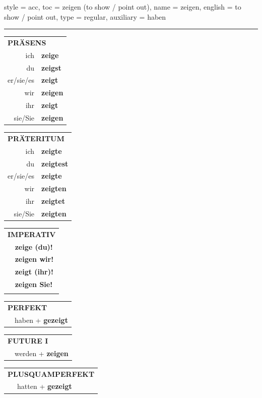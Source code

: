 \begin{verbentry}{
  style = {acc},
  toc = {zeigen (to show / point out)},
  name = {zeigen},
  english = {to show / point out},
  type = {regular},
  auxiliary = {haben}
}
 
    
     \vspace{5pt}

    \hrule
    
    \vspace{5pt}

  \begin{tabular}{rl}
     \multicolumn{2}{l}{\textbf{PRÄSENS} }\\
    ich & \textbf{zeige}\\
    du & \textbf{zeigst}\\
    er/sie/es & \textbf{zeigt}\\
    wir & \textbf{zeigen}\\
    ihr & \textbf{zeigt}\\
    sie/Sie & \textbf{zeigen}\\
  \end{tabular}
  \hfill
  \begin{tabular}{rl}
    \multicolumn{2}{l}{\textbf{PRÄTERITUM} }\\
    ich & \textbf{zeigte}\\
    du & \textbf{zeigtest}\\
    er/sie/es & \textbf{zeigte}\\
    wir & \textbf{zeigten}\\
    ihr & \textbf{zeigtet}\\
    sie/Sie & \textbf{zeigten}\\
  \end{tabular}
  \hfill
  \begin{tabular}{rl}
     \multicolumn{2}{l}{\textbf{IMPERATIV} }\\
   & \textbf{zeige (du)!}\\
   & \textbf{zeigen wir!}\\
   & \textbf{zeigt (ihr)!}\\
   & \textbf{zeigen Sie!}\\
   & \vspace{10pt}
  \end{tabular}

 \vspace{10pt}

 \begin{tabular}{rl}
     \multicolumn{2}{l}{\textbf{PERFEKT}}\\
   & haben + \textbf{gezeigt}\\
  \end{tabular}
\hfill
\begin{tabular}{rl}
    \multicolumn{2}{l}{\textbf{FUTURE I}}\\
   & werden + \textbf{zeigen}\\
  \end{tabular}
\hfill
\begin{tabular}{rl}
    \multicolumn{2}{l}{\textbf{PLUSQUAMPERFEKT}}\\
   & hatten + \textbf{gezeigt}\\
  \end{tabular}


\end{verbentry}
